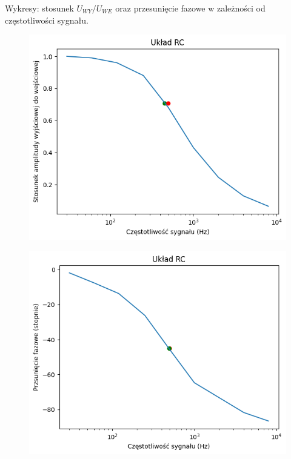 \documentclass[14pt, table]{extarticle}
\begin{document}
\begin{figure}[H]
    \centering
\end{figure}

\newpage
Wykresy: stosunek $U_{WY} / U_{WE}$ oraz przesunięcie fazowe w zależności od częstotliwości sygnału.

\begin{figure}[H]
\includegraphics[scale=0.7]{D2}
\centering
\captionsetup{labelformat=empty}
\caption{}
\end{figure}

\begin{figure}[H]
\includegraphics[scale=0.7]{D3}
\centering
\captionsetup{labelformat=empty}
\caption{}
\end{figure}
\end{document}
